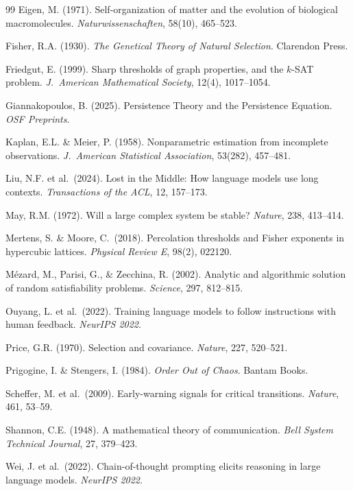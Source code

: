 \documentclass[11pt,a4paper]{article}
\begin{document}
\begin{thebibliography}{99}
Eigen, M. (1971).
Self-organization of matter and the evolution of biological macromolecules.
\emph{Naturwissenschaften}, 58(10), 465--523.

Fisher, R.A. (1930).
\emph{The Genetical Theory of Natural Selection}.
Clarendon Press.

Friedgut, E. (1999).
Sharp thresholds of graph properties, and the $k$-SAT problem.
\emph{J.\ American Mathematical Society}, 12(4), 1017--1054.

Giannakopoulos, B. (2025).
Persistence Theory and the Persistence Equation.
\emph{OSF Preprints}.

Kaplan, E.L. \& Meier, P. (1958).
Nonparametric estimation from incomplete observations.
\emph{J.\ American Statistical Association}, 53(282), 457--481.

Liu, N.F. et al.\ (2024).
Lost in the Middle: How language models use long contexts.
\emph{Transactions of the ACL}, 12, 157--173.

May, R.M. (1972).
Will a large complex system be stable?
\emph{Nature}, 238, 413--414.

Mertens, S. \& Moore, C.\ (2018).
Percolation thresholds and Fisher exponents in hypercubic lattices.
\emph{Physical Review E}, 98(2), 022120.

M\'{e}zard, M., Parisi, G., \& Zecchina, R. (2002).
Analytic and algorithmic solution of random satisfiability problems.
\emph{Science}, 297, 812--815.

Ouyang, L. et al.\ (2022).
Training language models to follow instructions with human feedback.
\emph{NeurIPS 2022}.

Price, G.R. (1970).
Selection and covariance.
\emph{Nature}, 227, 520--521.

Prigogine, I. \& Stengers, I. (1984).
\emph{Order Out of Chaos}.
Bantam Books.

Scheffer, M. et al.\ (2009).
Early-warning signals for critical transitions.
\emph{Nature}, 461, 53--59.

Shannon, C.E. (1948).
A mathematical theory of communication.
\emph{Bell System Technical Journal}, 27, 379--423.

Wei, J. et al.\ (2022).
Chain-of-thought prompting elicits reasoning in large language models.
\emph{NeurIPS 2022}.


\end{thebibliography}
\end{document}
